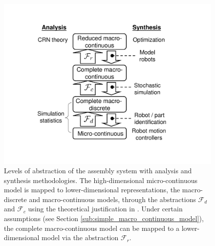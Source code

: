 \begin{figure}[t]
\centering
\includegraphics[trim= 30mm 30mm 30mm 20mm, clip,scale=0.35,angle=0]{img/FourLevels2.pdf}
\caption{Levels of abstraction of the assembly system with analysis
and synthesis methodologies.  The high-dimensional micro-continuous
model is mapped to lower-dimensional representations, the
macro-discrete and macro-continuous models, through the abstractions
$\mathcal{F}_d$ and $\mathcal{F}_c$ using the theoretical
justification in \cite{Gillespie:2007p1788}.  Under certain
assumptions (see Section \ref{sub:simple_macro_continuous_model}),
the complete macro-continuous model can be mapped to a
lower-dimensional model via the abstraction $\mathcal{F}_r$.}
\label{fig:fourlevel}
\end{figure}







